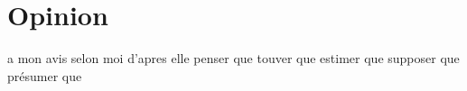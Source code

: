 \section{Opinion}
a mon avis
selon moi
d'apres elle
penser que
touver que
estimer que
supposer que
présumer que
